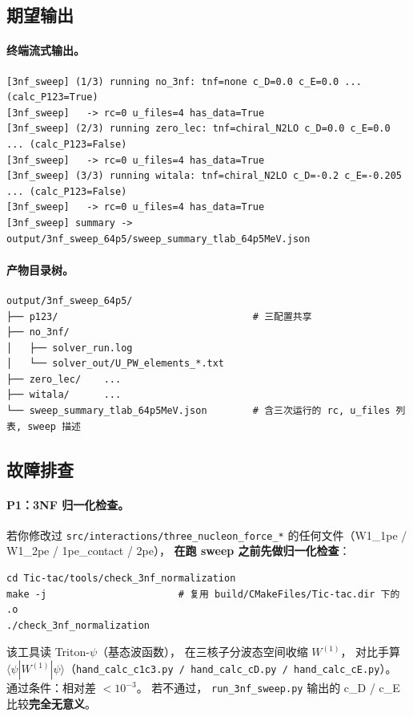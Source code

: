 \subsection{期望输出}
\label{sec:ch20-s3-expect}

\paragraph{终端流式输出。}
\begin{lstlisting}[style=config]
[3nf_sweep] (1/3) running no_3nf: tnf=none c_D=0.0 c_E=0.0 ... (calc_P123=True)
[3nf_sweep]   -> rc=0 u_files=4 has_data=True
[3nf_sweep] (2/3) running zero_lec: tnf=chiral_N2LO c_D=0.0 c_E=0.0 ... (calc_P123=False)
[3nf_sweep]   -> rc=0 u_files=4 has_data=True
[3nf_sweep] (3/3) running witala: tnf=chiral_N2LO c_D=-0.2 c_E=-0.205 ... (calc_P123=False)
[3nf_sweep]   -> rc=0 u_files=4 has_data=True
[3nf_sweep] summary -> output/3nf_sweep_64p5/sweep_summary_tlab_64p5MeV.json
\end{lstlisting}

\paragraph{产物目录树。}
\begin{lstlisting}[style=config]
output/3nf_sweep_64p5/
├── p123/                                  # 三配置共享
├── no_3nf/
│   ├── solver_run.log
│   └── solver_out/U_PW_elements_*.txt
├── zero_lec/    ...
├── witala/      ...
└── sweep_summary_tlab_64p5MeV.json        # 含三次运行的 rc, u_files 列表, sweep 描述
\end{lstlisting}

\subsection{故障排查}
\label{sec:ch20-s3-pitfalls}

\paragraph{P1：3NF 归一化检查。}
若你修改过 \texttt{src/interactions/three\_nucleon\_force\_*}
的任何文件（W1\_1pe / W1\_2pe / 1pe\_contact / 2pe），
\textbf{在跑 sweep 之前先做归一化检查}：
\begin{lstlisting}[style=config,caption={独立的 3NF 矩阵元归一化检查工具。}]
cd Tic-tac/tools/check_3nf_normalization
make -j                       # 复用 build/CMakeFiles/Tic-tac.dir 下的 .o
./check_3nf_normalization
\end{lstlisting}
该工具读 Triton-$\psi$（基态波函数），
在三核子分波态空间收缩 $W^{(1)}$，
对比手算 $\langle\psi|W^{(1)}|\psi\rangle$（\texttt{hand\_calc\_c1c3.py / hand\_calc\_cD.py / hand\_calc\_cE.py}）。
通过条件：相对差 $< 10^{-3}$。
若不通过，
\texttt{run\_3nf\_sweep.py} 输出的 c\_D / c\_E 比较\textbf{完全无意义}。


